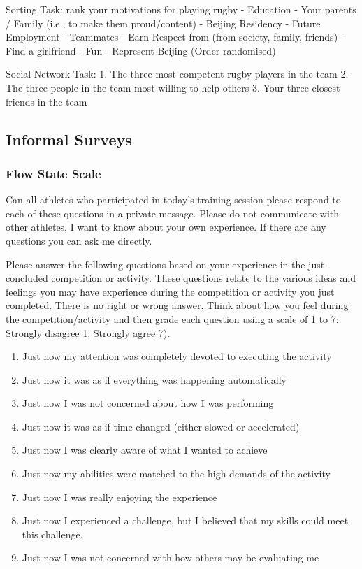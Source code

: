 \begin{CJK}{UTF8}{gbsn}
Sorting Task: rank your motivations for playing rugby
- Education
- Your parents / Family (i.e., to make them proud/content)
- Beijing Residency
- Future Employment
- Teammates
- Earn Respect from (from society, family, friends)
- Find a girlfriend
- Fun
- Represent Beijing
(Order randomised)

Social Network Task:
1.	The three most competent rugby players in the team
2.	The three people in the team most willing to help others
3.	Your three closest friends in the team



\subsection{Informal Surveys}



      \subsubsection{Flow State Scale\label{sect:flowStateScale}}

Can all athletes who participated in today's training session please respond to each of these questions in a private message. Please do not communicate with other athletes, I want to know about your own experience.  If there are any questions you can ask me directly.

Please answer the following questions based on your experience in the just-concluded competition or activity. These questions relate to the various ideas and feelings you may have experience during the competition or activity you just completed. There is no right or wrong answer. Think about how you feel during the competition/activity and then grade each question using a scale of 1 to 7: Strongly disagree 1; Strongly agree 7).


\begin{enumerate}
  \item Just now my attention was completely devoted to executing the activity
  \item Just now it was as if everything was happening automatically
  \item Just now I was not concerned about how I was performing
  \item Just now it was as if time changed (either slowed or accelerated)
  \item Just now I was clearly aware of what I wanted to achieve
  \item Just now my abilities were matched to the high demands of the activity
  \item Just now I was really enjoying the experience
  \item Just now I experienced a challenge, but I believed that my skills could meet this challenge.
  \item Just now I was not concerned with how others may be evaluating me
\end{enumerate}


\end{CJK}
